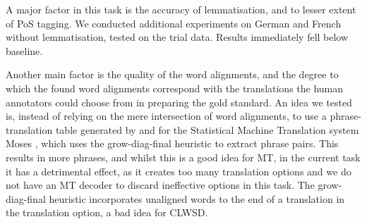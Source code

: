 \begin{table}[tbh]
\footnotesize
\noindent{}
\caption{Results on the test set}
\label{tabfinal}
\end{table}

A major factor in this task is the accuracy of lemmatisation, and to lesser
extent of PoS tagging. We conducted additional experiments on German and French
without lemmatisation, tested on the trial data. Results immediately fell below
baseline.

Another main factor is the quality of the word alignments, and the degree to
which the found word alignments correspond with the translations the human
annotators could choose from in preparing the gold standard. An idea we tested
is, instead of relying on the mere intersection of word alignments, to use a
phrase-translation table generated by and for the Statistical Machine
Translation system Moses \citep{Koehn+07}, which uses the grow-diag-final
heuristic to extract phrase pairs. This results in more phrases, and whilst
this is a good idea for MT, in the current task it has a detrimental effect, as
it creates too many translation options and we do not have an MT decoder to
discard ineffective options in this task. The grow-diag-final heuristic
incorporates unaligned words to the end of a translation in the translation
option, a bad idea for CLWSD.


